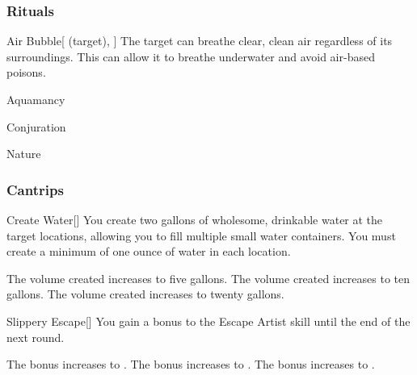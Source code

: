 \subsubsection{Rituals}


\lowercase{\hypertarget{spell:Air Bubble}{}}\label{spell:Air Bubble}
\begin{attuneability}[Rank 3]{\hypertarget{spell:Air Bubble}{Air Bubble}}[ (target), ]
The target can breathe clear, clean air regardless of its surroundings.
This can allow it to breathe underwater and avoid air-based poisons.
\end{attuneability}
\vspace{0.25em}


\newpage
\begin{spellsection}{Aquamancy}

\begin{spellheader}
\end{spellheader}


 Conjuration

 Nature

\subsubsection{Cantrips}


\begin{freeability}{Create Water}[]
You create two gallons of wholesome, drinkable water at the target locations, allowing you to fill multiple small water containers.
You must create a minimum of one ounce of water in each location.

\rankline
{} The volume created increases to five gallons.
 The volume created increases to ten gallons.
 The volume created increases to twenty gallons.
\end{freeability}


\begin{freeability}{Slippery Escape}[]
You gain a  bonus to the Escape Artist skill until the end of the next round.

\rankline
{} The bonus increases to .
 The bonus increases to .
 The bonus increases to .
\end{freeability}

\end{spellsection}


